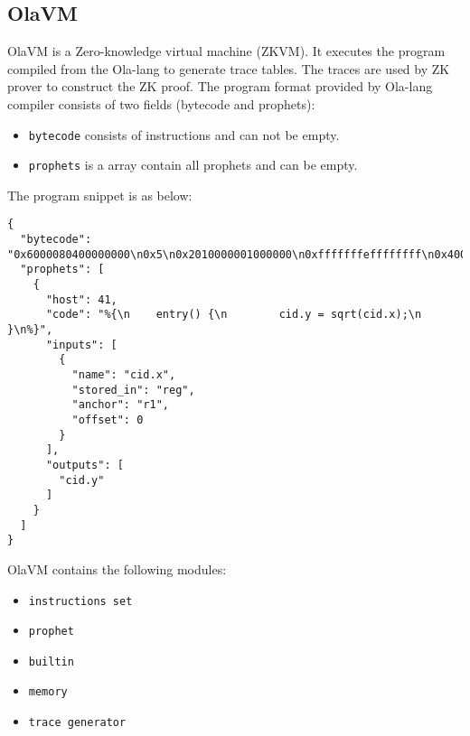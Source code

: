 \subsection{OlaVM} \label{sec:ola-vm}

OlaVM is a Zero-knowledge virtual machine (ZKVM). It executes the program compiled from the Ola-lang to generate trace tables. The traces are used by ZK prover to construct the ZK proof.
The program format provided by Ola-lang compiler consists of two fields (bytecode and prophets):
\begin{itemize}
    \item \verb|bytecode| consists of instructions and can not be empty.
    \item \verb|prophets| is a array contain all prophets and can be empty.
\end{itemize}

The program snippet is as below:
\begin{lstlisting}[label={lst:program-demo}]
{
  "bytecode": "0x6000080400000000\n0x5\n0x2010000001000000\n0xfffffffeffffffff\n0x4000000840000000\n0x0\n0x0030000001000000\n",
  "prophets": [
    {
      "host": 41,
      "code": "%{\n    entry() {\n        cid.y = sqrt(cid.x);\n    }\n%}",
      "inputs": [
        {
          "name": "cid.x",
          "stored_in": "reg",
          "anchor": "r1",
          "offset": 0
        }
      ],
      "outputs": [
        "cid.y"
      ]
    }
  ]
}
\end{lstlisting}


OlaVM contains the following modules:
\begin{itemize}
    \item \verb|instructions set|
    \item \verb|prophet|
    \item \verb|builtin|
    \item \verb|memory|
    \item \verb|trace generator|
\end{itemize}





